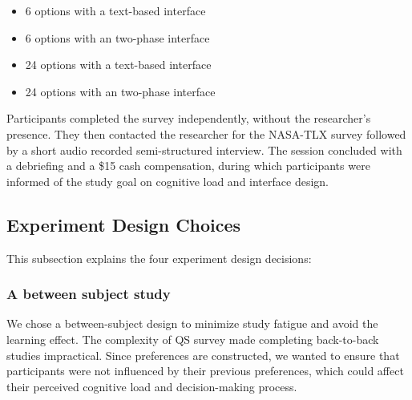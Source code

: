\begin{itemize}
    \item 6 options with a text-based interface
    \item 6 options with an two-phase interface
    \item 24 options with a text-based interface
    \item 24 options with an two-phase interface
\end{itemize}

Participants completed the survey independently, without the researcher's presence. They then contacted the researcher for the NASA-TLX survey followed by a short audio recorded semi-structured interview. The session concluded with a debriefing and a \$15 cash compensation, during which participants were informed of the study goal on cognitive load and interface design.

\subsection{Experiment Design Choices}
This subsection explains the four experiment design decisions:

\subsubsection{A between subject study}
We chose a between-subject design to minimize study fatigue and avoid the learning effect. The complexity of QS survey made completing back-to-back studies impractical. Since preferences are constructed, we wanted to ensure that participants were not influenced by their previous preferences, which could affect their perceived cognitive load and decision-making process.


